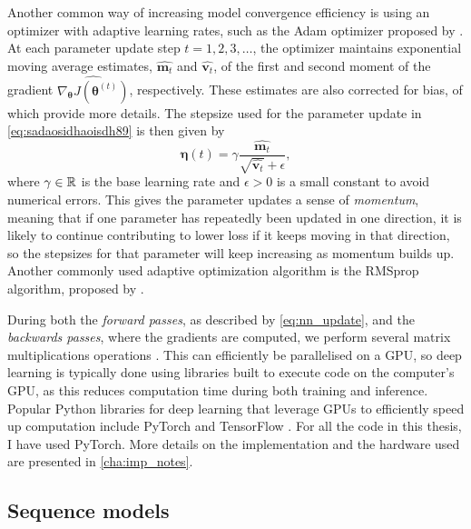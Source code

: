 \documentclass{statsmsc}
\begin{document}
{%
Another common way of increasing model convergence efficiency is using an optimizer with adaptive
learning rates, such as the Adam optimizer proposed by \cite{adam}.
At each parameter update step $t=1,2,3,\dots$, the optimizer maintains exponential moving average
estimates,
$\widehat{\mathbf{m}_t}$ and $\widehat{\mathbf{v}_t}$, of
the first and second moment of the gradient $\widehat{\nabla_{\bm\theta}
J\left(\bm\theta^{(t)}\right)}$, respectively. These estimates are also corrected for bias,
of which \cite{adam} provide more details.
The stepsize used for the parameter update in \cref{eq:sadaosidhaoisdh89} is then given by
\begin{equation}
    \bm\eta(t)=\gamma \frac{\widehat{\mathbf{m}_t}}{\sqrt{\widehat{\mathbf{v}_t}}+\epsilon},
\end{equation}
where $\gamma \in \mathbb{R}$ is the base learning rate and $\epsilon>0$ is a small constant to avoid
numerical errors.
This gives the parameter updates a sense of \textit{momentum}, meaning that if one parameter has
repeatedly been updated in one direction, it is likely to continue contributing to lower loss if
it keeps moving in that direction,
so the stepsizes for that parameter will keep increasing  as momentum builds up.
Another commonly used adaptive optimization algorithm is the RMSprop algorithm,
proposed by \cite{rmsprop}.

During both the \textit{forward passes}, as described by \cref{eq:nn_update}, and the
\textit{backwards passes}, where the gradients are computed, we perform
several matrix multiplications operations \citep{backprop}.
This can efficiently be parallelised on a \ac{GPU}, so deep learning is typically done using
libraries built to execute code on the computer's \ac{GPU}, as this reduces computation time
during both training and inference. Popular Python libraries for deep learning that leverage
\acp{GPU} to efficiently speed up computation include PyTorch \citep{pytorch} and TensorFlow \citep{tensorflow}. For all the code in this thesis, I have used PyTorch. More details on the implementation and the hardware used are presented in \cref{cha:imp_notes}.

\subsection{Sequence models}%
\label{sub:Sequence models}

}
\end{document}
